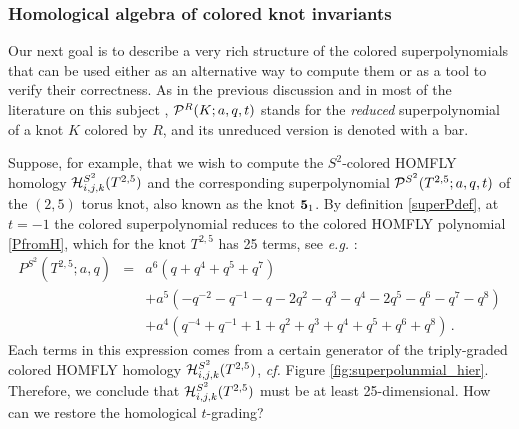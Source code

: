 \documentclass[hyper,letterpaper]{JHEP3}
\newcommand{\cH}{{\cal H }}
\renewcommand{\P}{{\cal P}}
\begin{document}

\subsubsection{Homological algebra of colored knot invariants}
\label{sec:homological}

Our next goal is to describe a very rich structure of the colored superpolynomials
that can be used either as an alternative way to compute them or as a tool to verify their correctness.
As in the previous discussion and in most of the literature on this subject \cite{KhPatterns,KhR1,DGR},
$\P^R (K;a,q,t)$ stands for the {\it reduced} superpolynomial of a knot $K$ colored by $R$,
and its unreduced version is denoted with a bar.

Suppose, for example, that we wish to compute the $S^2$-colored HOMFLY homology $\cH^{S^2}_{i,j,k} (T^{2,5})$
and the corresponding superpolynomial $\P^{S^2} (T^{2,5}; a,q,t)$ of the $(2,5)$ torus knot, also known as the knot ${\bf 5}_1$.
By definition \eqref{superPdef}, at $t=-1$ the colored superpolynomial reduces to the colored HOMFLY polynomial \eqref{PfromH},
which for the knot $T^{2,5}$ has 25 terms, see {\it e.g.} \cite{LinZheng}:
\begin{eqnarray}
P^{S^2} (T^{2,5}; a,q)
&=& a^6 \left( q + q^4 + q^5 + q^7 \right) \label{P25S2} \\
&& + a^5 \left( - q^{-2} - q^{-1} - q - 2 q^2 - q^3 - q^4 - 2 q^5 - q^6 - q^7 - q^8 \right) \nonumber \\
&& + a^4 \left( q^{-4} + q^{-1} + 1 + q^2 + q^3 + q^4 + q^5 + q^6 + q^8 \right) \,. \nonumber
\end{eqnarray}
Each terms in this expression comes from a certain generator
of the triply-graded colored HOMFLY homology $\cH^{S^2}_{i,j,k} (T^{2,5})$, {\it cf.} Figure \ref{fig:superpolunmial_hier}.
Therefore, we conclude that $\cH^{S^2}_{i,j,k} (T^{2,5})$ must be at least 25-dimensional.
How can we restore the homological $t$-grading?
\end{document}
